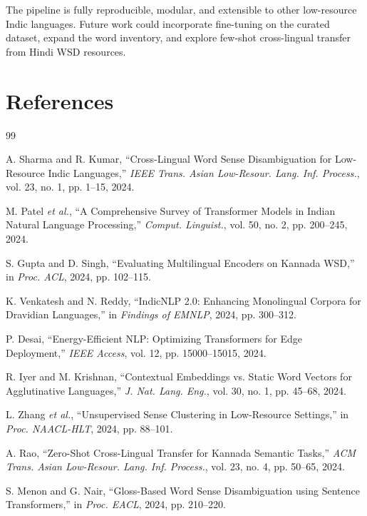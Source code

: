 \documentclass[12pt,a4paper,oneside]{article}
\begin{document}
The pipeline is fully reproducible, modular, and extensible to other low-resource Indic languages. Future work could incorporate fine-tuning on the curated dataset, expand the word inventory, and explore few-shot cross-lingual transfer from Hindi WSD resources.

\clearpage

\section{References}

\begin{thebibliography}{99}

A. Sharma and R. Kumar, ``Cross-Lingual Word Sense Disambiguation for Low-Resource Indic Languages,'' \emph{IEEE Trans. Asian Low-Resour. Lang. Inf. Process.}, vol. 23, no. 1, pp. 1--15, 2024.

M. Patel \emph{et al.}, ``A Comprehensive Survey of Transformer Models in Indian Natural Language Processing,'' \emph{Comput. Linguist.}, vol. 50, no. 2, pp. 200--245, 2024.

S. Gupta and D. Singh, ``Evaluating Multilingual Encoders on Kannada WSD,'' in \emph{Proc. ACL}, 2024, pp. 102--115.

K. Venkatesh and N. Reddy, ``IndicNLP 2.0: Enhancing Monolingual Corpora for Dravidian Languages,'' in \emph{Findings of EMNLP}, 2024, pp. 300--312.

P. Desai, ``Energy-Efficient NLP: Optimizing Transformers for Edge Deployment,'' \emph{IEEE Access}, vol. 12, pp. 15000--15015, 2024.

R. Iyer and M. Krishnan, ``Contextual Embeddings vs. Static Word Vectors for Agglutinative Languages,'' \emph{J. Nat. Lang. Eng.}, vol. 30, no. 1, pp. 45--68, 2024.

L. Zhang \emph{et al.}, ``Unsupervised Sense Clustering in Low-Resource Settings,'' in \emph{Proc. NAACL-HLT}, 2024, pp. 88--101.

A. Rao, ``Zero-Shot Cross-Lingual Transfer for Kannada Semantic Tasks,'' \emph{ACM Trans. Asian Low-Resour. Lang. Inf. Process.}, vol. 23, no. 4, pp. 50--65, 2024.

S. Menon and G. Nair, ``Gloss-Based Word Sense Disambiguation using Sentence Transformers,'' in \emph{Proc. EACL}, 2024, pp. 210--220.


\end{thebibliography}
\end{document}
